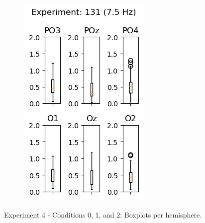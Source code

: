 \begin{figure}[ht]
\begin{subfigure}{0.25\linewidth}
        \includegraphics[width=\linewidth]{images/appendix/13175.png}
        \label{fig:13175}
    \end{subfigure}
    \caption{Experiment 4 - Conditions 0, 1, and 2: Boxplots per hemisphere.}
    \label{fig:4-6675}
\end{figure}



